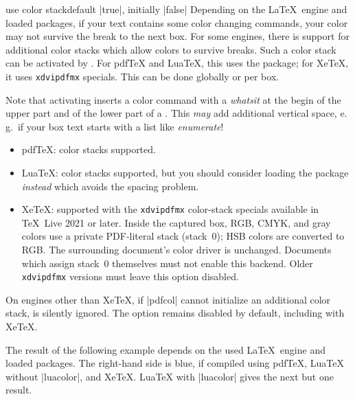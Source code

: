 \begin{docTcbKey}[][doc new and updated={2020-10-09}{2026-11-11}]{use color stack}{}{default |true|, initially |false|}
  Depending on the \LaTeX\ engine and loaded packages, if your text contains some
  color changing commands, your color may not survive the break to the next box.
  For some engines, there is support for additional color stacks which
  allow colors to survive breaks. Such a color stack  can be activated
  by . For pdf\TeX{} and Lua\TeX{}, this uses
  the  package; for Xe\TeX{}, it uses \texttt{xdvipdfmx} specials.
  This can be done globally or per box.
  \begin{marker}
  Note that activating  inserts a color command with a \emph{whatsit}
  at the begin of the upper part and of the lower part of a .
  This \emph{may} add additional vertical space, e.\,g.\ if your box text starts
  with a list like \emph{enumerate}!
  \end{marker}
  \begin{itemize}
  \item pdf\TeX: color stacks supported.
  \item Lua\TeX: color stacks supported, but you should consider loading the
      package \emph{instead} which avoids the spacing problem.
  \item Xe\TeX: supported with the \texttt{xdvipdfmx} color-stack specials
    available in \TeX\ Live 2021 or later. Inside the captured box, RGB, CMYK,
    and gray colors use a private PDF-literal stack (stack~0); HSB colors
    are converted to RGB. The surrounding
    document's color driver is unchanged. Documents which assign stack~0
    themselves must not enable this backend. Older \texttt{xdvipdfmx} versions
    must leave this option disabled.
  \end{itemize}
  On engines other than Xe\TeX{}, if |pdfcol| cannot initialize an additional
  color stack,  is silently ignored.
  The option remains disabled by default, including with Xe\TeX{}.

\clearpage
The result of the following example depends on the used  \LaTeX\ engine and
loaded packages. The right-hand side is blue, if compiled using
pdf\TeX, Lua\TeX{} without |luacolor|, and  Xe\TeX.
Lua\TeX{} with |luacolor| gives the next but one result.


\end{docTcbKey}
